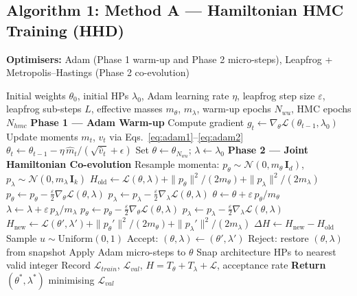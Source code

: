 \documentclass[11pt]{article}
\theoremstyle{definition}
\begin{document}
\subsection{Algorithm 1: Method A --- Hamiltonian HMC Training (HHD)}
\begin{algorithm}[H]
\caption{Method A --- Hamiltonian HMC Training (HHD)}
\label{alg:hhd}
\textbf{Optimisers:} Adam (Phase 1 warm-up and Phase 2 micro-steps),
Leapfrog + Metropolis--Hastings (Phase 2 co-evolution)
\begin{algorithmic}[1]
\Require Initial weights $\theta_0$, initial HPs $\lambda_0$,
         Adam learning rate $\eta$,
         leapfrog step size $\varepsilon$,
         leapfrog sub-steps $L$,
         effective masses $m_\theta$, $m_\lambda$,
         warm-up epochs $N_{wu}$,
         HMC epochs $N_{hmc}$
\State \textbf{Phase 1 --- Adam Warm-up}
  \State Compute gradient $g_t \leftarrow \nabla_\theta\mathcal{L}(\theta_{t-1}, \lambda_0)$
  \State Update moments $m_t$, $v_t$ via Eqs.~\eqref{eq:adam1}--\eqref{eq:adam2}
  \State $\theta_t \leftarrow \theta_{t-1} - \eta\,\hat{m}_t / (\sqrt{\hat{v}_t} + \epsilon)$
\EndFor
\State Set $\theta \leftarrow \theta_{N_{wu}}$; $\lambda \leftarrow \lambda_0$
\State \textbf{Phase 2 --- Joint Hamiltonian Co-evolution}
  \State Resample momenta:
         $p_\theta \sim \mathcal{N}(0, m_\theta\,\mathbf{I}_d)$,
         $p_\lambda \sim \mathcal{N}(0, m_\lambda\,\mathbf{I}_k)$
  \State $H_{\mathrm{old}} \leftarrow \mathcal{L}(\theta,\lambda)
            + \|p_\theta\|^2/(2m_\theta)
            + \|p_\lambda\|^2/(2m_\lambda)$
    \State $p_\theta \leftarrow p_\theta
              - \tfrac{\varepsilon}{2}\nabla_\theta\mathcal{L}(\theta,\lambda)$
    \State $p_\lambda \leftarrow p_\lambda
              - \tfrac{\varepsilon}{2}\nabla_\lambda\mathcal{L}(\theta,\lambda)$
    \State $\theta \leftarrow \theta + \varepsilon\,p_\theta/m_\theta$
    \State $\lambda \leftarrow \lambda + \varepsilon\,p_\lambda/m_\lambda$
    \State $p_\theta \leftarrow p_\theta
              - \tfrac{\varepsilon}{2}\nabla_\theta\mathcal{L}(\theta,\lambda)$
    \State $p_\lambda \leftarrow p_\lambda
              - \tfrac{\varepsilon}{2}\nabla_\lambda\mathcal{L}(\theta,\lambda)$
  \EndFor
  \State $H_{\mathrm{new}} \leftarrow \mathcal{L}(\theta',\lambda')
            + \|p_\theta'\|^2/(2m_\theta)
            + \|p_\lambda'\|^2/(2m_\lambda)$
  \State $\Delta H \leftarrow H_{\mathrm{new}} - H_{\mathrm{old}}$
  \State Sample $u \sim \mathrm{Uniform}(0, 1)$
    \State Accept: $(\theta, \lambda) \leftarrow (\theta', \lambda')$
  \Else
    \State Reject: restore $(\theta, \lambda)$ from snapshot
  \EndIf
  \State Apply Adam micro-steps to $\theta$
  \State Snap architecture HPs to nearest valid integer
  \State Record $\mathcal{L}_{train}$, $\mathcal{L}_{val}$,
         $H = T_\theta + T_\lambda + \mathcal{L}$, acceptance rate
\EndFor
\State \textbf{Return} $(\theta^*, \lambda^*)$ minimising $\mathcal{L}_{val}$
\end{algorithmic}
\end{algorithm}
\end{document}
